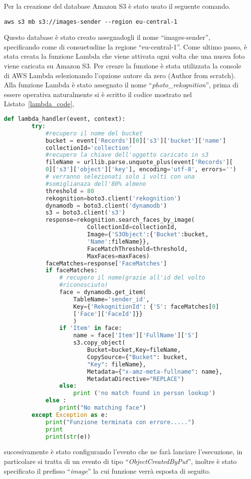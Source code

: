 Per la creazione del database Amazon S3 è stato usato il seguente comando.
\begin{lstlisting}[frame=lines]
    aws s3 mb s3://images-sender --region eu-central-1
\end{lstlisting}
Questo database è stato creato assegnadogli il nome ``images-sender'', specificando come di consuetudine la regione ``eu-central-1''.
Come ultimo passo, è stata creata la funzione Lambda che viene attivata ogni volta che una nuova foto viene caricata su Amazon S3. Per creare la funzione è stata 
utilizzata la console di AWS Lambda selezionando l'opzione autore da zero (Author from scratch).
Alla funzione Lambda è stato assegnato il nome ``\textsl{photo\_rekognition}'', prima di essere operativa naturalmente si è scritto il codice mostrato nel 
Listato~\ref{lambda_code},
\begin{lstlisting}[language=Python,frame=single,caption=Codice Lambda,captionpos=t,label=lambda_code]
    def lambda_handler(event, context):
        try:
            #recupero il nome del bucket
            bucket = event['Records'][0]['s3']['bucket']['name']
            collectionId='collection'
            #recupero la chiave dell'oggetto caricato in s3
            fileName = urllib.parse.unquote_plus(event['Records'][
            0]['s3']['object']['key'], encoding='utf-8', errors='')
            # verranno selezionati solo i volti con una 
            #somiglianaza dell'80% almeno
            threshold = 80
            rekognition=boto3.client('rekognition')
            dynamodb = boto3.client('dynamodb')
            s3 = boto3.client('s3')
            response=rekognition.search_faces_by_image(
                        CollectionId=collectionId,
                        Image={'S3Object':{'Bucket':bucket,
                        'Name':fileName}},
                        FaceMatchThreshold=threshold,
                        MaxFaces=maxFaces)
            faceMatches=response['FaceMatches']
            if faceMatches:
                # recupero il nome(grazie all'id del volto 
                #riconosciuto)
                face = dynamodb.get_item(
                    TableName='sender_id',  
                    Key={'RekognitionId': {'S': faceMatches[0]
                    ['Face']['FaceId']}}
                    )
                if 'Item' in face:
                    name = face['Item']['FullName']['S']
                    s3.copy_object(
                        Bucket=bucket,Key=fileName,
                        CopySource={"Bucket": bucket, 
                        "Key": fileName},
                        Metadata={"x-amz-meta-fullname": name},
                        MetadataDirective="REPLACE")
                else:
                    print ('no match found in person lookup')
            else :
                print("No matching face")
        except Exception as e:
            print("Funzione terminata con errore.....")
            print
            print(str(e))
\end{lstlisting}
succesivamente è stato configurando l'evento che ne farà lanciare l'esecuzione, in particolare si tratta di un evento di tipo ``\textsl{ObjectCreatedByPut}'', 
inoltre è stato specificato il prefisso ``\textsl{image}'' la cui funzione verrà esposta di seguito.


